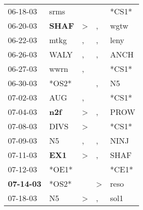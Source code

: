 \begin{supertabular}{p{0.07\textwidth}p{0.06\textwidth}p{0.02\textwidth}p{0.02\textwidth}p{0.06\textwidth}}
          06-18-03\textsuperscript{} &           srms\textsuperscript{} &                  &                  &                            *CS1* \\
          06-20-03\textsuperscript{} &  \textbf{SHAF\textsuperscript{}} &     \textgreater &                , &           wgtw\textsuperscript{} \\
          06-22-03\textsuperscript{} &           mtkg\textsuperscript{} &                , &                , &           leny\textsuperscript{} \\
          06-26-03\textsuperscript{} &           WALY\textsuperscript{} &                , &                , &           ANCH\textsuperscript{} \\
          06-27-03\textsuperscript{} &           wwrn\textsuperscript{} &                , &                  &                            *CS1* \\
          06-30-03\textsuperscript{} &                            *OS2* &                  &                , &             N5\textsuperscript{} \\
          07-02-03\textsuperscript{} &            AUG\textsuperscript{} &                , &                  &                            *CS1* \\
          07-04-03\textsuperscript{} &   \textbf{n2f\textsuperscript{}} &     \textgreater &                , &           PROW\textsuperscript{} \\
          07-08-03\textsuperscript{} &           DIVS\textsuperscript{} &     \textgreater &                  &                            *CS1* \\
          07-09-03\textsuperscript{} &             N5\textsuperscript{} &                , &                , &           NINJ\textsuperscript{} \\
          07-11-03\textsuperscript{} &   \textbf{EX1\textsuperscript{}} &     \textgreater &                , &           SHAF\textsuperscript{} \\
          07-12-03\textsuperscript{} &                            *OE1* &                  &                  &                            *CE1* \\
 \textbf{07-14-03\textsuperscript{}} &                            *OS2* &                  &     \textgreater &           reso\textsuperscript{} \\
          07-18-03\textsuperscript{} &             N5\textsuperscript{} &     \textgreater &                , &           sol1\textsuperscript{} \\

\end{supertabular}
